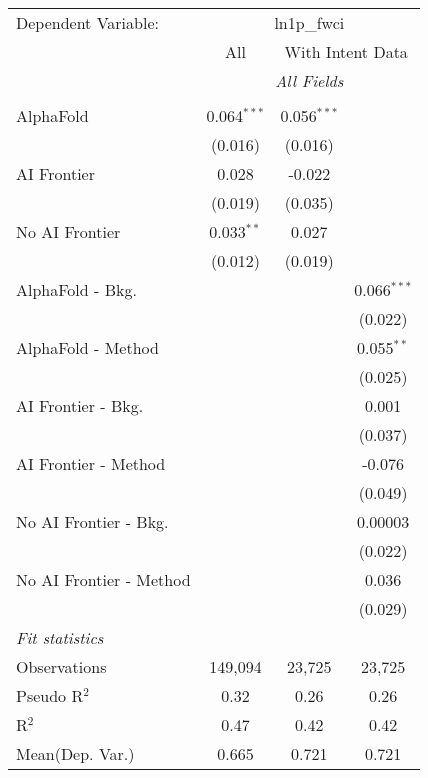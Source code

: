 \begingroup
\centering
\begin{tabular}{lccc}
   \tabularnewline \midrule \midrule
   Dependent Variable: & \multicolumn{3}{c}{ln1p\_fwci}\\
 & \multicolumn{1}{c}{All} & \multicolumn{2}{c}{With Intent Data} \\
\cmidrule(lr){2-2} \cmidrule(lr){3-4}
 & \multicolumn{3}{c}{\textit{All Fields}} \\ \\
   AlphaFold               & 0.064$^{***}$ & 0.056$^{***}$ &   \\   
                           & (0.016)       & (0.016)       &   \\   
   AI Frontier             & 0.028         & -0.022        &   \\   
                           & (0.019)       & (0.035)       &   \\   
   No AI Frontier          & 0.033$^{**}$  & 0.027         &   \\   
                           & (0.012)       & (0.019)       &   \\   
   AlphaFold - Bkg.        &               &               & 0.066$^{***}$\\   
                           &               &               & (0.022)\\   
   AlphaFold - Method      &               &               & 0.055$^{**}$\\   
                           &               &               & (0.025)\\   
   AI Frontier - Bkg.      &               &               & 0.001\\   
                           &               &               & (0.037)\\   
   AI Frontier - Method    &               &               & -0.076\\   
                           &               &               & (0.049)\\   
   No AI Frontier - Bkg.   &               &               & 0.00003\\   
                           &               &               & (0.022)\\   
   No AI Frontier - Method &               &               & 0.036\\   
                           &               &               & (0.029)\\   
   \midrule
   \emph{Fit statistics}\\
   Observations            & 149,094       & 23,725        & 23,725\\  
   Pseudo R$^2$            & 0.32          & 0.26          & 0.26\\  
   R$^2$                   & 0.47          & 0.42          & 0.42\\  
Mean(Dep. Var.) & 0.665 & 0.721 & 0.721 \\
   

\end{tabular}
